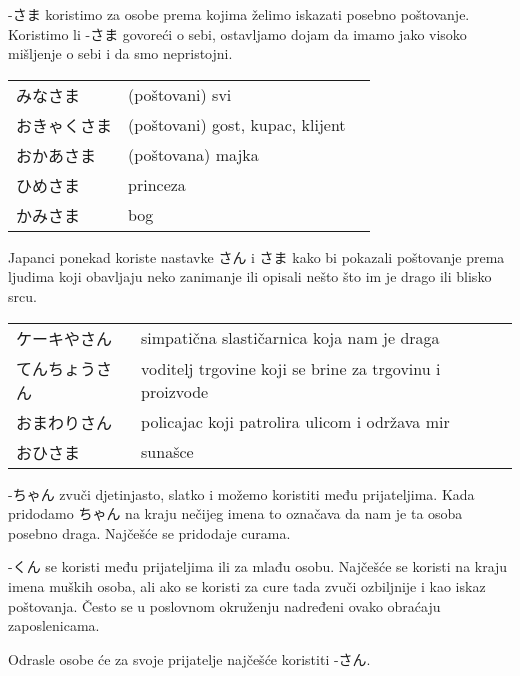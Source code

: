 	-さま koristimo za osobe prema kojima želimo iskazati posebno poštovanje. Koristimo li -さま govoreći o sebi, ostavljamo dojam da imamo jako visoko mišljenje o sebi i da smo nepristojni. 

	\begin{table}[!h]
	\begin{tabular}{l l l}
		\toprule[2pt]
		みなさま&(poštovani) svi\\
		おきゃくさま&(poštovani) gost, kupac, klijent\\
		おかあさま&(poštovana) majka\\
		ひめさま&princeza\\
		かみさま&bog\\
		\bottomrule[2pt]
	\end{tabular}
	\end{table}
	\newpage	
	
	Japanci ponekad koriste nastavke さん i さま kako bi pokazali poštovanje prema ljudima koji obavljaju neko zanimanje ili opisali nešto što im je drago ili blisko srcu.
	
	\begin{table}[!h]
	\begin{tabular}{l l}
		\toprule[2pt]
		ケーキやさん&simpatična slastičarnica koja nam je draga\\
		てんちょうさん&voditelj trgovine koji se brine za trgovinu i proizvode\\
		おまわりさん&policajac koji patrolira ulicom i održava mir\\
		おひさま&sunašce\\
		\bottomrule[2pt]
	\end{tabular}
	\end{table}


	-ちゃん zvuči djetinjasto, slatko i možemo koristiti među prijateljima. Kada pridodamo ちゃん na kraju nečijeg imena to označava da nam je ta osoba posebno draga. Najčešće se pridodaje curama.\newline
	
	
	-くん se koristi među prijateljima ili za mlađu osobu. Najčešće se koristi na kraju imena muških osoba, ali ako se koristi za cure tada zvuči ozbiljnije i kao iskaz poštovanja. Često se u poslovnom okruženju nadređeni ovako obraćaju zaposlenicama.\newline
	

Odrasle osobe će za svoje prijatelje najčešće koristiti -さん.\newline


